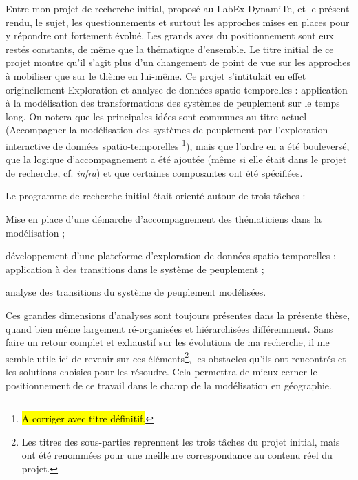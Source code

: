 Entre mon projet de recherche initial, proposé au LabEx DynamiTe, et le présent rendu, le sujet, les questionnements et surtout les approches mises en places pour y répondre ont fortement évolué.
Les grands axes du positionnement sont eux restés constants, de même que la thématique d'ensemble.
Le titre initial de ce projet montre qu'il s'agit plus d'un changement de point de vue sur les approches à mobiliser que sur le thème en lui-même.
Ce projet s'intitulait en effet originellement \og Exploration et analyse de données spatio-temporelles : application à la modélisation des transformations des systèmes de peuplement sur le temps long\fg{}.
On notera que les principales idées sont communes au titre actuel (\og Accompagner la modélisation des systèmes de peuplement par l'exploration interactive de données spatio-temporelles \fg{}\footnote{
	\hl{A corriger avec titre définitif.}
}), mais que l'ordre en a été bouleversé, que la logique d'accompagnement a été ajoutée (même si elle était dans le projet de recherche, cf. \textit{infra}) et que certaines composantes ont été spécifiées.

Le programme de recherche initial était orienté autour de trois tâches :

\begin{compactenum}\vspace*{-.5em}
	\item \og Mise en place d'une démarche d'accompagnement des thématiciens dans la modélisation\fg{} ;
	\item \og développement d'une plateforme d'exploration de données spatio-temporelles : application à des transitions dans le système de peuplement\fg{} ;
	\item \og analyse des transitions du système de peuplement modélisées\fg{}.
\end{compactenum}\vspace*{-.5em}

Ces grandes dimensions d'analyses sont toujours présentes dans la présente thèse, quand bien même largement ré-organisées et hiérarchisées différemment.
Sans faire un retour complet et exhaustif sur les évolutions de ma recherche, il me semble utile ici de revenir sur ces éléments\footnote{
	Les titres des sous-parties reprennent les trois tâches du projet initial, mais ont été renommées pour une meilleure correspondance au contenu réel du projet.
}, les obstacles qu'ils ont rencontrés et les solutions choisies pour les résoudre.
Cela permettra de mieux cerner le positionnement de ce travail dans le champ de la modélisation en géographie.



